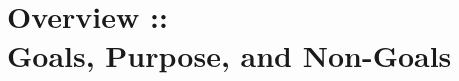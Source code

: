 \documentclass[../main.tex]{subfiles}
\begin{document}
\chapter[Overview :: Purpose, Goals, and Non-Goals]{Overview ::\\Goals, Purpose, and Non-Goals}
\end{document}
